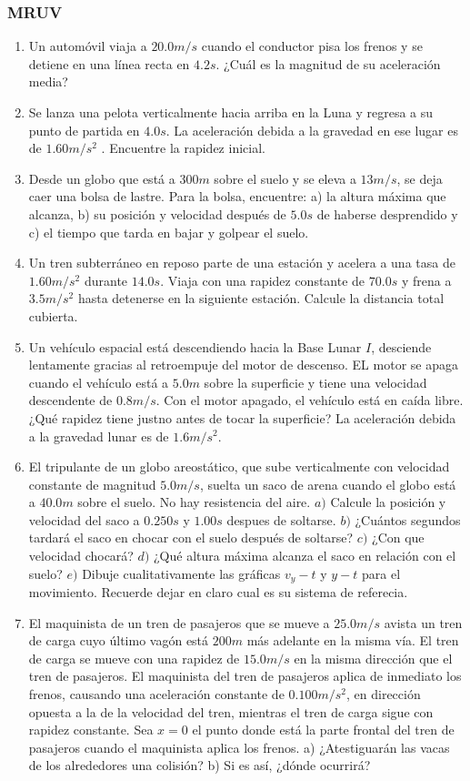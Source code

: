 \subsubsection{MRUV}
	\begin{enumerate}
		\item Un automóvil viaja a $20.0 m / s$ cuando el conductor pisa los frenos y se detiene en una línea recta en $4.2 s$.
¿Cuál es la magnitud de su aceleración media?
		\item Se lanza una pelota verticalmente hacia arriba en la Luna y regresa a su punto de partida en $4.0 s$. La
aceleración debida a la gravedad en ese lugar es de $1.60 m / s^2$ . Encuentre la rapidez inicial.
		\item Desde un globo que está a $300 m$ sobre el suelo y se eleva a $13 m / s$, se deja caer una bolsa de lastre.
Para la bolsa, encuentre: a) la altura máxima que alcanza, b) su posición y velocidad después de $5.0 s$ de
haberse desprendido y c) el tiempo que tarda en bajar y golpear el suelo.
		\item Un tren subterráneo en reposo parte de una estación y acelera a una tasa de $1.60m/s^2$ durante $14.0s$. Viaja con una rapidez constante de $70.0s$ y frena a $3.5m/s^2$ hasta detenerse en la siguiente estación. Calcule la distancia total cubierta.
		\item Un vehículo espacial está descendiendo hacia la Base Lunar $I$, desciende lentamente gracias al retroempuje del motor de descenso. EL motor se apaga cuando el vehículo está a $5.0m$ sobre la superficie y tiene una velocidad descendente de $0.8m/s$. Con el motor apagado, el vehículo está en caída libre. ¿Qué rapidez tiene justno antes de tocar la superficie? La aceleración debida a la gravedad lunar es de $1.6m/s^2$.
		\item El tripulante de un globo areostático, que sube verticalmente con velocidad constante de magnitud $5.0m/s$, suelta un saco de arena cuando el globo está a $40.0m$ sobre el suelo. No hay resistencia del aire. $a)$ Calcule la posición y velocidad del saco a $0.250s$ y $1.00s$ despues de soltarse. $b)$ ¿Cuántos segundos tardará el saco en chocar con el suelo después de soltarse? $c)$ ¿Con que velocidad chocará? $d)$ ¿Qué altura máxima alcanza el saco en relación con el suelo? $e)$ Dibuje cualitativamente las gráficas $v_y - t$ y $y-t$ para el movimiento. Recuerde dejar en claro cual es su sistema de referecia.
		\item El maquinista de un tren de pasajeros que se mueve
a $25.0 m/s$ avista un tren de carga cuyo último vagón está $200 m$ más adelante en la misma vía. El tren de carga se mueve
con una rapidez de $15.0 m/s$ en la misma dirección que el tren de
pasajeros. El maquinista del tren de pasajeros aplica de inmediato los
frenos, causando una aceleración constante de $0.100 m/s^2$, en dirección
opuesta a la de la velocidad del tren, mientras el tren de carga
sigue con rapidez constante. Sea $x = 0$ el punto donde está la parte
frontal del tren de pasajeros cuando el maquinista aplica los frenos.
a) ¿Atestiguarán las vacas de los alrededores una colisión? b) Si es
así, ¿dónde ocurrirá?
	\end{enumerate}
